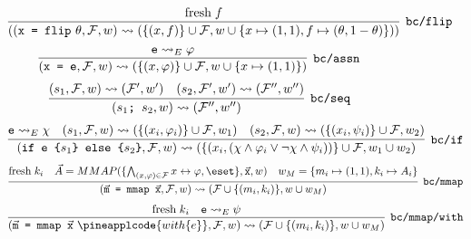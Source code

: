 \begin{figure}
\begin{mdframed}
  {\footnotesize
  \begin{align*}
    \infer[\texttt{bc/flip}]
    {
        ((\texttt{x = flip} \ \theta, \mathcal{F}, w) \leadsto
        (\{(x, f)\} \cup \mathcal{F},
        w \cup \{x \mapsto (1, 1), f \mapsto (\theta, 1-\theta)\}))
    }
    {\mathrm{fresh} \; f}
  \end{align*}
  \begin{align*}
    \infer[\texttt{bc/assn}]
    {
      (\texttt{x = e}, \mathcal{F}, w) \leadsto
      (\{(x,  \varphi)\} \cup \mathcal{F}, w \cup \{x \mapsto (1, 1)\})
    }
    {
      \texttt e \leadsto_E \varphi
    }
  \end{align*}
  \begin{align*}
    \infer[\texttt{bc/seq}]
    {
        (\texttt{$s_1$; $s_2$}, w) \leadsto (\mathcal{F}'', w'')
    }
    {
        (s_1, \mathcal{F}, w) \leadsto (\mathcal{F}', w')
        & (s_2, \mathcal{F}', w') \leadsto (\mathcal{F}'', w'')
    }
  \end{align*}
  \begin{align*}
    \infer[\texttt{bc/if}]
    {
      (\texttt{if e \{$s_1$\} else \{$s_2$\}}, \mathcal{F}, w) \leadsto
    (\{(x_i, (\chi \land \varphi_i \lor \neg\chi \land \psi_i))\} \cup \mathcal{F}, w_1 \cup w_2)
    }
    {
        \texttt e \leadsto_E \chi
        & (s_1, \mathcal{F}, w) \leadsto (\{(x_i, \varphi_i)\} \cup \mathcal{F}, w_1)
        & (s_2, \mathcal{F}, w) \leadsto (\{(x_i, \psi_i)\} \cup \mathcal{F}, w_2)
    }
  \end{align*}
  \begin{align*}
    \infer[\texttt{bc/mmap}]
    {
      (\vec{\texttt{m}}\texttt{ = mmap }\vec{\texttt{x}}, \mathcal{F}, w) \leadsto
      (\mathcal{F} \cup \{(m_i, k_i) \}, w \cup w_{M})
    }
    {
      \mathrm{fresh} \; k_i
      & \vec A = MMAP(\{\bigwedge_{(x, \varphi) \in \mathcal{F}} x \leftrightarrow \varphi, \eset\}, \vec{\texttt{x}}, w)
      &
      w_{M} = \{m_i \mapsto (1,1), k_i \mapsto A_i \}
    }
  \end{align*}
  \begin{align*}
    \infer[\texttt{bc/mmap/with}]
    {
      (\vec{\texttt{m}}\texttt{ = mmap }\vec{\texttt{x}} \ \pineapplcode{ with \{e\}}, \mathcal{F}, w) \leadsto
      (\mathcal{F} \cup \{(m_i, k_i) \}, w \cup w_{M})
    }
    {
      \mathrm{fresh} \; k_i
      & \texttt e \leadsto_E \psi
}
\end{align*}}
\end{mdframed}
\end{figure}
